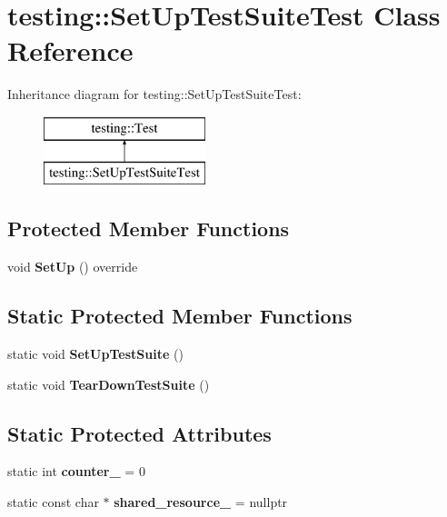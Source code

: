 \hypertarget{classtesting_1_1SetUpTestSuiteTest}{}\section{testing\+:\+:Set\+Up\+Test\+Suite\+Test Class Reference}
\label{classtesting_1_1SetUpTestSuiteTest}
Inheritance diagram for testing\+:\+:Set\+Up\+Test\+Suite\+Test\+:\begin{figure}[H]
\begin{center}
\leavevmode
\includegraphics[height=2.000000cm]{classtesting_1_1SetUpTestSuiteTest}
\end{center}
\end{figure}
\subsection*{Protected Member Functions}
\begin{DoxyCompactItemize}
\item 
\mbox{\label{classtesting_1_1SetUpTestSuiteTest_ac01379a3be015db77866fe224807b219}} 
void {\bfseries Set\+Up} () override
\end{DoxyCompactItemize}
\subsection*{Static Protected Member Functions}
\begin{DoxyCompactItemize}
\item 
\mbox{\label{classtesting_1_1SetUpTestSuiteTest_ad64c250ae98154efebf05e3aa5e02b40}} 
static void {\bfseries Set\+Up\+Test\+Suite} ()
\item 
\mbox{\label{classtesting_1_1SetUpTestSuiteTest_a9ab506ec2496b6c79415afb635c30372}} 
static void {\bfseries Tear\+Down\+Test\+Suite} ()
\end{DoxyCompactItemize}
\subsection*{Static Protected Attributes}
\begin{DoxyCompactItemize}
\item 
\mbox{\label{classtesting_1_1SetUpTestSuiteTest_a13b24510288241cd6f0b3bc71e716da5}} 
static int {\bfseries counter\+\_\+} = 0
\item 
\mbox{\label{classtesting_1_1SetUpTestSuiteTest_a91d5526233a6cbbe776cdfe80f39492a}} 
static const char $\ast$ {\bfseries shared\+\_\+resource\+\_\+} = nullptr
\end{DoxyCompactItemize}
